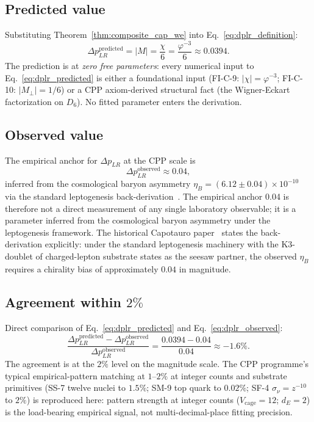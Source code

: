 \documentclass[11pt,letterpaper]{article}
\newcommand{\phig}{\varphi}
\newcommand{\DeltapLR}{\Delta p_{LR}}
\newcommand{\Dsix}{D_6}
\newcommand{\sigmanu}{\sigma_\nu}
\begin{document}
\subsection{Predicted value}\label{sec:dplr_predicted}

Substituting Theorem~\ref{thm:composite_cap_we} into Eq.~\eqref{eq:dplr_definition}:
\begin{equation}\label{eq:dplr_predicted}
\DeltapLR^{\text{predicted}} = |M| = \frac{\chi}{6} = \frac{\phig^{-3}}{6} \approx 0.0394.
\end{equation}
The prediction is at \emph{zero free parameters}: every numerical input to Eq.~\eqref{eq:dplr_predicted} is either a foundational input (FI-C-9: $|\chi| = \phig^{-3}$; FI-C-10: $|M_\perp| = 1/6$) or a CPP axiom-derived structural fact (the Wigner-Eckart factorization on $\Dsix$). No fitted parameter enters the derivation.

\subsection{Observed value}\label{sec:dplr_observed}

The empirical anchor for $\DeltapLR$ at the CPP scale is
\begin{equation}\label{eq:dplr_observed}
\DeltapLR^{\text{observed}} \approx 0.04,
\end{equation}
inferred from the cosmological baryon asymmetry $\eta_B = (6.12 \pm 0.04) \times 10^{-10}$~\cite{planck_2018} via the standard leptogenesis back-derivation~\cite{abshier_grok_capotauro_2025}. The empirical anchor 0.04 is therefore not a direct measurement of any single laboratory observable; it is a parameter inferred from the cosmological baryon asymmetry under the leptogenesis framework. The historical Capotauro paper~\cite{abshier_grok_capotauro_2025} states the back-derivation explicitly: under the standard leptogenesis machinery with the K3-doublet of charged-lepton substrate states as the seesaw partner, the observed $\eta_B$ requires a chirality bias of approximately $0.04$ in magnitude.

\subsection{Agreement within $2\%$}\label{sec:dplr_agreement}

Direct comparison of Eq.~\eqref{eq:dplr_predicted} and Eq.~\eqref{eq:dplr_observed}:
\[
\frac{\DeltapLR^{\text{predicted}} - \DeltapLR^{\text{observed}}}{\DeltapLR^{\text{observed}}} = \frac{0.0394 - 0.04}{0.04} \approx -1.6\%.
\]
The agreement is at the $2\%$ level on the magnitude scale. The CPP programme's typical empirical-pattern matching at $1$--$2\%$ at integer counts and substrate primitives (SS-7 twelve nuclei to $1.5\%$; SM-9 top quark to $0.02\%$; SF-4 $\sigmanu = z^{-10}$ to $2\%$) is reproduced here: pattern strength at integer counts ($V_\text{cage} = 12$; $d_E = 2$) is the load-bearing empirical signal, not multi-decimal-place fitting precision.
\end{document}
